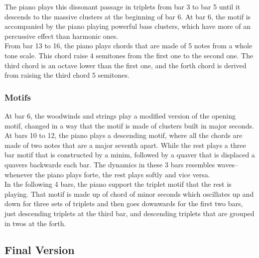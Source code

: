 \documentclass{article}
\begin{document}
The piano plays this dissonant passage in triplets from bar 3 to bar 5
until it descends to the massive clusters at the beginning of bar 6.
At bar 6, the motif is accompanied by the piano playing powerful bass clusters,
which have more of an percussive effect than harmonic ones.\\

From bar 13 to 16, the piano plays chords that are made of 5 notes from
a whole tone scale. This chord raise 4 semitones from the first one
to the second one. The third chord is an octave lower than the first one,
and the forth chord is derived from raising the third chord 5 semitones.

\subsubsection{Motifs}


At bar 6, the woodwinds and strings play a modified version
of the opening motif, changed in a way that the motif
is made of clusters built in major seconds.
At bars 10 to 12, the piano plays a descending motif,
where all the chords are made of two notes that are a major seventh apart.
While the rest plays a three bar motif that is constructed by a minim,
followed by a quaver that is displaced a quavers backwards each bar.
The dynamics in these 3 bars resembles waves--whenever the piano plays forte,
the rest plays softly and vice versa.\\

In the following 4 bars, the piano support the triplet motif that the rest is
playing. That motif is made up of chord of minor seconds which oscillates up
and down for three sets of triplets and then goes downwards for the first two
bars, just descending triplets at the third bar, and descending triplets
that are grouped in twos at the forth.

\subsection{Final Version}

\end{document}
